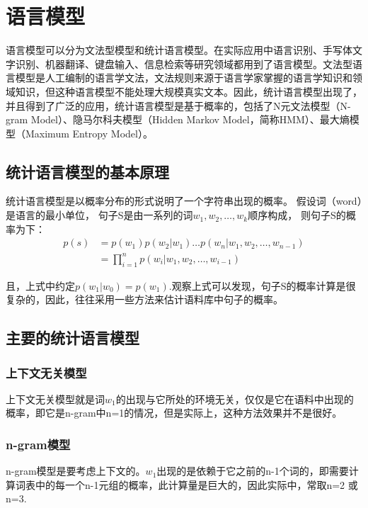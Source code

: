 \chapter{语言模型}
    语言模型可以分为文法型模型和统计语言模型。在实际应用中语言识别、手写体文字识别、机器翻译、键盘输入、信息检索等研究领域都用到了语言模型。文法型语言模型是人工编制的语言学文法，文法规则来源于语言学家掌握的语言学知识和领域知识，但这种语言模型不能处理大规模真实文本。因此，统计语言模型出现了，并且得到了广泛的应用，统计语言模型是基于概率的，包括了N元文法模型（N-gram Model）、隐马尔科夫模型（Hidden Markov Model，简称HMM）、最大熵模型（Maximum Entropy Model）。

    \section{统计语言模型的基本原理}

    统计语言模型是以概率分布的形式说明了一个字符串出现的概率。
    假设词（word）是语言的最小单位，
    句子S是由一系列的词$w_1,w_2, \dots,w_k$顺序构成，
    则句子S的概率为下：
    \begin{equation}
        \begin{split}
            p(s) &= p(w_1)p(w_2|w_1)\dots p(w_n|w_1,w_2,\dots,w_{n-1}) \\
            &=\prod_{i=1}^{n}p(w_i|w_1,w_2,\dots,w_{i-1}) 
        \end{split}
    \end{equation}

    且，上式中约定$p(w_1|w_0)=p(w_1)$.观察上式可以发现，句子S的概率计算是很复杂的，因此，往往采用一些方法来估计语料库中句子的概率。

    \section{主要的统计语言模型}
    \subsection{上下文无关模型}
    上下文无关模型就是词$w_1$的出现与它所处的环境无关，仅仅是它在语料中出现的概率，即它是n-gram中n=1的情况，但是实际上，这种方法效果并不是很好。

    \subsection{n-gram模型}
    n-gram模型是要考虑上下文的。$w_1$出现的是依赖于它之前的n-1个词的，即需要计算词表中的每一个n-1元组的概率，此计算量是巨大的，因此实际中，常取n=2 或n=3.

